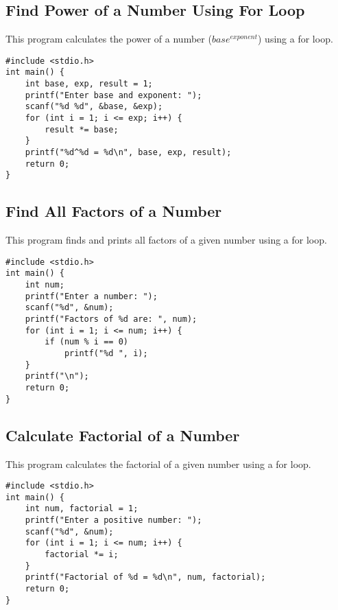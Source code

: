 \documentclass[a4paper,12pt]{article}
\begin{document}
\newpage

\subsection{Find Power of a Number Using For Loop}
This program calculates the power of a number (\(base^{exponent}\)) using a for loop.

\begin{lstlisting}[caption={Find Power of a Number Using For Loop}]
#include <stdio.h>
int main() {
    int base, exp, result = 1;
    printf("Enter base and exponent: ");
    scanf("%d %d", &base, &exp);
    for (int i = 1; i <= exp; i++) {
        result *= base;
    }
    printf("%d^%d = %d\n", base, exp, result);
    return 0;
}
\end{lstlisting}

\newpage

\subsection{Find All Factors of a Number}
This program finds and prints all factors of a given number using a for loop.

\begin{lstlisting}[caption={Find All Factors of a Number}]
#include <stdio.h>
int main() {
    int num;
    printf("Enter a number: ");
    scanf("%d", &num);
    printf("Factors of %d are: ", num);
    for (int i = 1; i <= num; i++) {
        if (num % i == 0)
            printf("%d ", i);
    }
    printf("\n");
    return 0;
}
\end{lstlisting}

\newpage

\subsection{Calculate Factorial of a Number}
This program calculates the factorial of a given number using a for loop.

\begin{lstlisting}[caption={Calculate Factorial of a Number}]
#include <stdio.h>
int main() {
    int num, factorial = 1;
    printf("Enter a positive number: ");
    scanf("%d", &num);
    for (int i = 1; i <= num; i++) {
        factorial *= i;
    }
    printf("Factorial of %d = %d\n", num, factorial);
    return 0;
}
\end{lstlisting}
\end{document}
